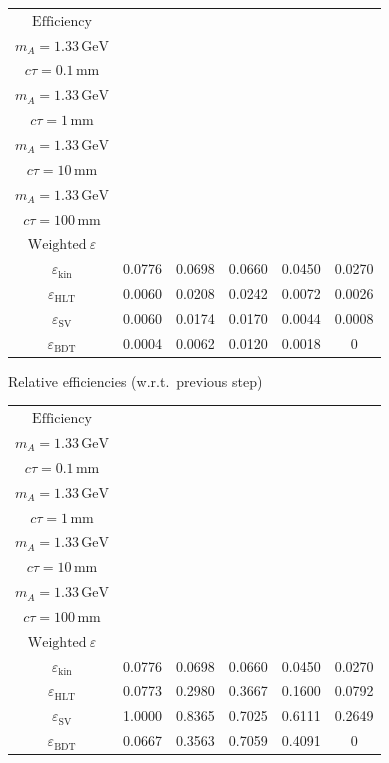 \documentclass[10pt,a4paper]{article}
\begin{document}
{\begin{tabular}{cccccc}
\toprule
$\mathrm{Efficiency}$ & \shortstack{$m_{\pi}=4\,\mathrm{GeV}$\\$m_{A}=1.33\,\mathrm{GeV}$\\$c\tau=0.1\,\mathrm{mm}$} & \shortstack{$m_{\pi}=4\,\mathrm{GeV}$\\$m_{A}=1.33\,\mathrm{GeV}$\\$c\tau=1\,\mathrm{mm}$} & \shortstack{$m_{\pi}=4\,\mathrm{GeV}$\\$m_{A}=1.33\,\mathrm{GeV}$\\$c\tau=10\,\mathrm{mm}$} & \shortstack{$m_{\pi}=4\,\mathrm{GeV}$\\$m_{A}=1.33\,\mathrm{GeV}$\\$c\tau=100\,\mathrm{mm}$} & \shortstack{$\mathrm{QCD}$\\$\mathrm{Weighted}\ \varepsilon$} \\
\midrule
$\varepsilon_{\mathrm{kin}}$ & 0.0776 & 0.0698 & 0.0660 & 0.0450 & 0.0270\\
$\varepsilon_{\mathrm{HLT}}$ & 0.0060 & 0.0208 & 0.0242 & 0.0072 & 0.0026\\
$\varepsilon_{\mathrm{SV}}$ & 0.0060 & 0.0174 & 0.0170 & 0.0044 & 0.0008\\
$\varepsilon_{\mathrm{BDT}}$ & 0.0004 & 0.0062 & 0.0120 & 0.0018 & $0$\\
\bottomrule
\end{tabular}

\vspace{18pt}

Relative efficiencies (w.r.t.\ previous step)

\begin{tabular}{cccccc}
\toprule
$\mathrm{Efficiency}$ & \shortstack{$m_{\pi}=4\,\mathrm{GeV}$\\$m_{A}=1.33\,\mathrm{GeV}$\\$c\tau=0.1\,\mathrm{mm}$} & \shortstack{$m_{\pi}=4\,\mathrm{GeV}$\\$m_{A}=1.33\,\mathrm{GeV}$\\$c\tau=1\,\mathrm{mm}$} & \shortstack{$m_{\pi}=4\,\mathrm{GeV}$\\$m_{A}=1.33\,\mathrm{GeV}$\\$c\tau=10\,\mathrm{mm}$} & \shortstack{$m_{\pi}=4\,\mathrm{GeV}$\\$m_{A}=1.33\,\mathrm{GeV}$\\$c\tau=100\,\mathrm{mm}$} & \shortstack{$\mathrm{QCD}$\\$\mathrm{Weighted}\ \varepsilon$} \\
\midrule
$\varepsilon_{\mathrm{kin}}$ & 0.0776 & 0.0698 & 0.0660 & 0.0450 & 0.0270\\
$\varepsilon_{\mathrm{HLT}}$ & 0.0773 & 0.2980 & 0.3667 & 0.1600 & 0.0792\\
$\varepsilon_{\mathrm{SV}}$ & 1.0000 & 0.8365 & 0.7025 & 0.6111 & 0.2649\\
$\varepsilon_{\mathrm{BDT}}$ & 0.0667 & 0.3563 & 0.7059 & 0.4091 & $0$\\
\bottomrule
\end{tabular}

}
\end{document}
